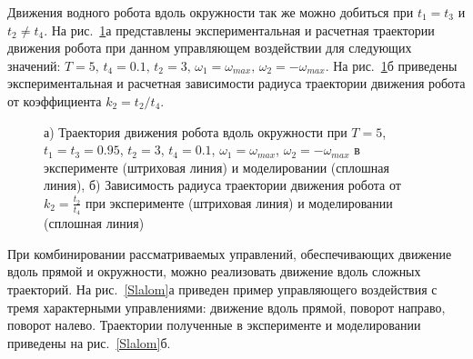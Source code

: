 Движения водного робота вдоль окружности так же можно добиться при $t_1 = t_3$ и $t_2 \neq t_4$. На рис.~\ref{ControlActionOur}а представлены экспериментальная и расчетная траектории движения робота при данном управляющем воздействии для следующих значений: $ T=5,\, t_4 = 0.1,\, t_2 = 3,\, \omega_1 = \omega_{max},\, \omega_2 = -\omega_{max} $. На рис.~\ref{ControlActionOur}б приведены экспериментальная и расчетная зависимости радиуса траектории движения робота от коэффициента $k_2 = t_2 / t_4$. 

\begin{figure}[!ht]
	\begin{minipage}[h]{0.5\linewidth}
	\end{minipage}
	\hfill
	\begin{minipage}[h]{0.5\linewidth}
	\end{minipage}
	\caption{а) Траектория движения робота вдоль окружности при $T = 5$, $t_1 = t_3 = 0.95$, $t_2 = 3$, $t_4 = 0.1$, $\omega_1 = \omega_{max}$, $\omega_2 = -\omega_{max}$ в эксперименте (штриховая линия) и моделировании (сплошная линия), б) Зависимость радиуса траектории движения робота от $k_2 = \frac{t_2}{t_4}$ при эксперименте (штриховая линия) и моделировании (сплошная линия)}
	\label{ControlActionOur}
\end{figure}




При комбинировании рассматриваемых управлений, обеспечивающих движение вдоль прямой и окружности, можно реализовать движение вдоль сложных траекторий. На рис.~\ref{Slalom}а приведен пример управляющего воздействия с тремя характерными управлениями: движение вдоль прямой, поворот направо, поворот налево.   Траектории полученные в эксперименте и моделировании приведены на рис.~\ref{Slalom}б.

